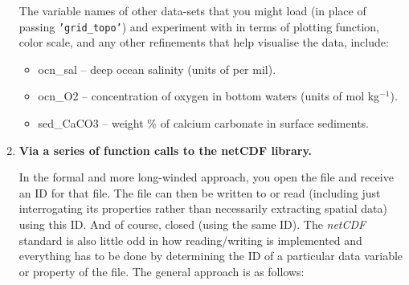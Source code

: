 \documentclass{tufte-book} %
\begin{document}
\begin{enumerate}
The variable names of other data-sets that you might load (in place of passing \texttt{'grid\_topo'})  and experiment with in terms of plotting function, color scale, and any other refinements that help visualise the data, include:

\begin{itemize}[noitemsep]
\setlength{\itemindent}{.2in}
\item \textsf{ocn\_sal} -- deep ocean salinity (units of per mil).
\item \textsf{ocn\_O2} -- concentration of oxygen in bottom waters (units of mol kg\(^{-1}\)).
\item \textsf{sed\_CaCO3} -- weight \% of calcium carbonate in surface sediments.
\end{itemize}

\item \textbf{Via a series of function calls to the netCDF library.}

\noindent In the formal and more long-winded approach, you open the file and receive an ID for that file. The file can then be written to or read (including just interrogating its properties rather than necessarily extracting spatial data) using this ID. And of course, closed (using the same ID). The \textit{netCDF} standard is also little odd in how reading/writing is implemented and everything has to be done by determining the ID of a particular data variable or property of the file. 
The general approach is as follows:


\end{enumerate}
\end{document}
